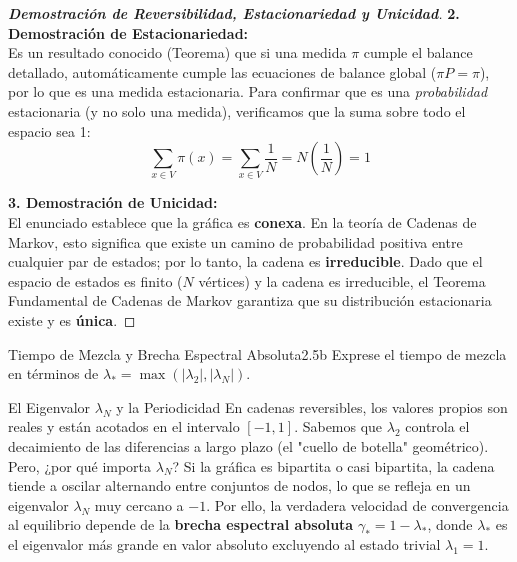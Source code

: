 \documentclass[10pt,a4paper]{article}
\begin{document}
\begin{proof}[\textbf{Demostración de Reversibilidad, Estacionariedad y Unicidad}]
    \vspace{3mm}
    \textbf{2. Demostración de Estacionariedad:} \\
    Es un resultado conocido (Teorema) que si una medida $\pi$ cumple el balance detallado, automáticamente cumple las ecuaciones de balance global ($\pi P = \pi$), por lo que es una medida estacionaria.
    Para confirmar que es una \textit{probabilidad} estacionaria (y no solo una medida), verificamos que la suma sobre todo el espacio sea 1:
    \[ \sum_{x \in V} \pi(x) = \sum_{x \in V} \frac{1}{N} = N \left( \frac{1}{N} \right) = 1 \]
    
    \vspace{3mm}
    \textbf{3. Demostración de Unicidad:} \\
    El enunciado establece que la gráfica es \textbf{conexa}. En la teoría de Cadenas de Markov, esto significa que existe un camino de probabilidad positiva entre cualquier par de estados; por lo tanto, la cadena es \textbf{irreducible}.
    Dado que el espacio de estados es finito ($N$ vértices) y la cadena es irreducible, el Teorema Fundamental de Cadenas de Markov garantiza que su distribución estacionaria existe y es \textbf{única}.
\end{proof}


\newpage


\begin{ejercicio}{Tiempo de Mezcla y Brecha Espectral Absoluta}{2.5b}
    Exprese el tiempo de mezcla en términos de $\lambda_* = \max(|\lambda_2|, |\lambda_N|)$.
\end{ejercicio}

\vspace{2mm}

\begin{nota}{El Eigenvalor $\lambda_N$ y la Periodicidad}
    En cadenas reversibles, los valores propios son reales y están acotados en el intervalo $[-1, 1]$.
    Sabemos que $\lambda_2$ controla el decaimiento de las diferencias a largo plazo (el "cuello de botella" geométrico). Pero, ¿por qué importa $\lambda_N$? 
    Si la gráfica es bipartita o casi bipartita, la cadena tiende a oscilar alternando entre conjuntos de nodos, lo que se refleja en un eigenvalor $\lambda_N$ muy cercano a $-1$.
    Por ello, la verdadera velocidad de convergencia al equilibrio depende de la \textbf{brecha espectral absoluta} $\gamma_* = 1 - \lambda_*$, donde $\lambda_*$ es el eigenvalor más grande en valor absoluto excluyendo al estado trivial $\lambda_1 = 1$.
\end{nota}
\end{document}
